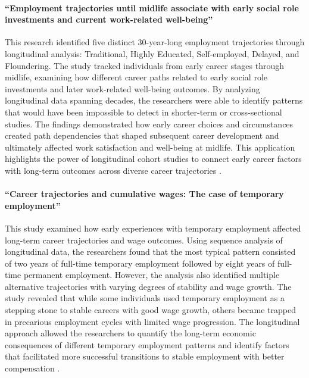 \documentclass[../main.tex]{subfiles}
\begin{document}
\paragraph{``Employment trajectories until midlife associate with early social role investments and current work-related well-being''}
This research identified five distinct 30-year-long employment trajectories through longitudinal analysis: Traditional, Highly Educated, Self-employed, Delayed, and Floundering. The study tracked individuals from early career stages through midlife, examining how different career paths related to early social role investments and later work-related well-being outcomes. By analyzing longitudinal data spanning decades, the researchers were able to identify patterns that would have been impossible to detect in shorter-term or cross-sectional studies. The findings demonstrated how early career choices and circumstances created path dependencies that shaped subsequent career development and ultimately affected work satisfaction and well-being at midlife. This application highlights the power of longitudinal cohort studies to connect early career factors with long-term outcomes across diverse career trajectories \citep{kokko2013employment}.

\paragraph{``Career trajectories and cumulative wages: The case of temporary employment''}
This study examined how early experiences with temporary employment affected long-term career trajectories and wage outcomes. Using sequence analysis of longitudinal data, the researchers found that the most typical pattern consisted of two years of full-time temporary employment followed by eight years of full-time permanent employment. However, the analysis also identified multiple alternative trajectories with varying degrees of stability and wage growth. The study revealed that while some individuals used temporary employment as a stepping stone to stable careers with good wage growth, others became trapped in precarious employment cycles with limited wage progression. The longitudinal approach allowed the researchers to quantify the long-term economic consequences of different temporary employment patterns and identify factors that facilitated more successful transitions to stable employment with better compensation \citep{manzoni2014career}.
\end{document}
